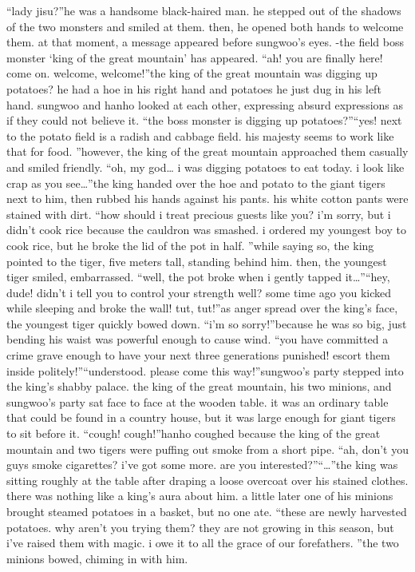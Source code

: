“lady jisu?”he was a handsome black-haired man.
 he stepped out of the shadows of the two monsters and smiled at them.
 then, he opened both hands to welcome them.
at that moment, a message appeared before sungwoo’s eyes.
-the field boss monster ‘king of the great mountain’ has appeared.
“ah! you are finally here! come on.
 welcome, welcome!”the king of the great mountain was digging up potatoes? he had a hoe in his right hand and potatoes he just dug in his left hand.
sungwoo and hanho looked at each other, expressing absurd expressions as if they could not believe it.
“the boss monster is digging up potatoes?”“yes! next to the potato field is a radish and cabbage field.
 his majesty seems to work like that for food.
”however, the king of the great mountain approached them casually and smiled friendly.
“oh, my god… i was digging potatoes to eat today.
 i look like crap as you see…”the king handed over the hoe and potato to the giant tigers next to him, then rubbed his hands against his pants.
 his white cotton pants were stained with dirt.
“how should i treat precious guests like you? i’m sorry, but i didn’t cook rice because the cauldron was smashed.
 i ordered my youngest boy to cook rice, but he broke the lid of the pot in half.
”while saying so, the king pointed to the tiger, five meters tall, standing behind him.
then, the youngest tiger smiled, embarrassed.
“well, the pot broke when i gently tapped it…”“hey, dude! didn’t i tell you to control your strength well? some time ago you kicked while sleeping and broke the wall! tut, tut!”as anger spread over the king’s face, the youngest tiger quickly bowed down.
“i’m so sorry!”because he was so big, just bending his waist was powerful enough to cause wind.
“you have committed a crime grave enough to have your next three generations punished! escort them inside politely!”“understood.
 please come this way!”sungwoo’s party stepped into the king’s shabby palace.
the king of the great mountain, his two minions, and sungwoo’s party sat face to face at the wooden table.
it was an ordinary table that could be found in a country house, but it was large enough for giant tigers to sit before it.
“cough! cough!”hanho coughed because the king of the great mountain and two tigers were puffing out smoke from a short pipe.
“ah, don’t you guys smoke cigarettes? i’ve got some more.
 are you interested?”“…”the king was sitting roughly at the table after draping a loose overcoat over his stained clothes.
there was nothing like a king’s aura about him.
a little later one of his minions brought steamed potatoes in a basket, but no one ate.
“these are newly harvested potatoes.
 why aren’t you trying them? they are not growing in this season, but i’ve raised them with magic.
 i owe it to all the grace of our forefathers.
”the two minions bowed, chiming in with him.


